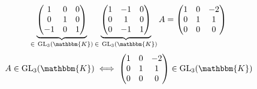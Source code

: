 \begin{exm}
	\begin{align*}
		\underbrace{
		\begin{pmatrix}
			1&0&0\\
			0&1&0\\
			-1&0&1
		\end{pmatrix}
		}_{\in~ \mathrm{GL}_3(\mathbbm{K})}
		\underbrace{\begin{pmatrix}
			1&-1&0\\
			0&1&0\\
			0&-1&1
		\end{pmatrix}}_{\in~ \mathrm{GL}_3(\mathbbm{K})}
		A = 
		\begin{pmatrix}
			1 & 0 & -2\\
			0 & 1 & 1\\
			0 & 0 & 0
		\end{pmatrix}
	\end{align*}
	\begin{align*}
		A  \in \mathrm{GL}_3(\mathbbm{K})
		\iff
		\begin{pmatrix}
			1&0&-2\\
			0&1&1\\
			0&0&0
		\end{pmatrix} \in \mathrm{GL}_3 (\mathbbm{K})
	\end{align*}
\end{exm}

